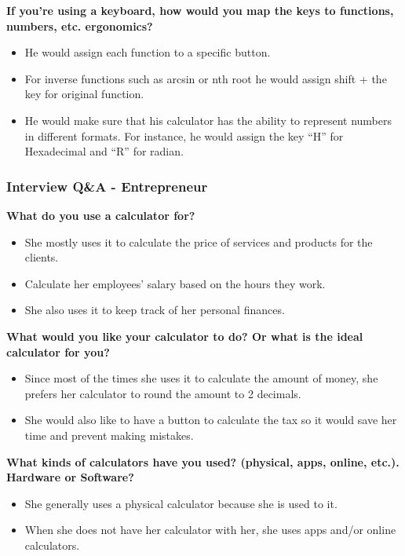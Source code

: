 \documentclass[a4paper]{article}
\begin{document}
\textbf{If you’re using a keyboard, how would you map the keys to functions, numbers, etc. ergonomics?}
\begin{itemize}
\itemsep0em 
\item He would assign each function to a specific button. 
\item For inverse functions such as arcsin or nth root he would assign shift + the key for original function. 
\item He would make sure that his calculator has the ability to represent numbers in different formats. For instance, he would assign the key “H” for Hexadecimal and “R” for radian.  
\end{itemize}
\pagebreak


\subsubsection*{Interview Q\&A - Entrepreneur}
\textbf{What do you use a calculator for?}
\begin{itemize}
\itemsep0em 
\item She mostly uses it to calculate the price of services and products for the clients. 
\item Calculate her employees’ salary based on the hours they work.
\item She also uses it to keep track of her personal finances.
\end{itemize}

\textbf{What would you like your calculator to do? Or what is the ideal calculator for you?}
\begin{itemize}
\itemsep0em 
\item Since most of the times she uses it to calculate the amount of money, she prefers her calculator to round the amount to 2 decimals.
\item She would also like to have a button to calculate the tax so it would save her time and prevent making mistakes.
\end{itemize}

\textbf{What kinds of calculators have you used? (physical, apps, online, etc.). Hardware or Software?}
\begin{itemize}
\itemsep0em 
\item She generally uses a physical calculator because she is used to it.
\item When she does not have her calculator with her, she uses apps and/or online calculators.
\end{itemize}
\end{document}
